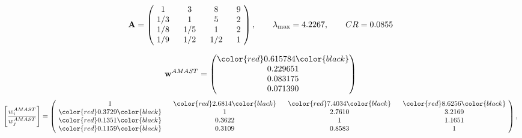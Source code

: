 \begin{example}
\begin{equation*}
\mathbf{A} =
\begin{pmatrix}
$\,\,$ 1 $\,\,$ & $\,\,$3$\,\,$ & $\,\,$8$\,\,$ & $\,\,$9 $\,\,$ \\
$\,\,$ 1/3$\,\,$ & $\,\,$ 1 $\,\,$ & $\,\,$5$\,\,$ & $\,\,$2 $\,\,$ \\
$\,\,$ 1/8$\,\,$ & $\,\,$ 1/5$\,\,$ & $\,\,$ 1 $\,\,$ & $\,\,$2 $\,\,$ \\
$\,\,$ 1/9$\,\,$ & $\,\,$ 1/2$\,\,$ & $\,\,$ 1/2$\,\,$ & $\,\,$ 1  $\,\,$ \\
\end{pmatrix},
\qquad
\lambda_{\max} =
4.2267,
\qquad
CR = 0.0855
\end{equation*}

\begin{equation*}
\mathbf{w}^{AMAST} =
\begin{pmatrix}
\color{red} 0.615784\color{black} \\
0.229651\\
0.083175\\
0.071390
\end{pmatrix}\end{equation*}
\begin{equation*}
\left[ \frac{{w}^{AMAST}_i}{{w}^{AMAST}_j} \right] =
\begin{pmatrix}
$\,\,$ 1 $\,\,$ & $\,\,$\color{red} 2.6814\color{black} $\,\,$ & $\,\,$\color{red} 7.4034\color{black} $\,\,$ & $\,\,$\color{red} 8.6256\color{black} $\,\,$ \\
$\,\,$\color{red} 0.3729\color{black} $\,\,$ & $\,\,$ 1 $\,\,$ & $\,\,$2.7610$\,\,$ & $\,\,$3.2169  $\,\,$ \\
$\,\,$\color{red} 0.1351\color{black} $\,\,$ & $\,\,$0.3622$\,\,$ & $\,\,$ 1 $\,\,$ & $\,\,$1.1651 $\,\,$ \\
$\,\,$\color{red} 0.1159\color{black} $\,\,$ & $\,\,$0.3109$\,\,$ & $\,\,$0.8583$\,\,$ & $\,\,$ 1  $\,\,$ \\
\end{pmatrix},
\end{equation*}


\end{example}
